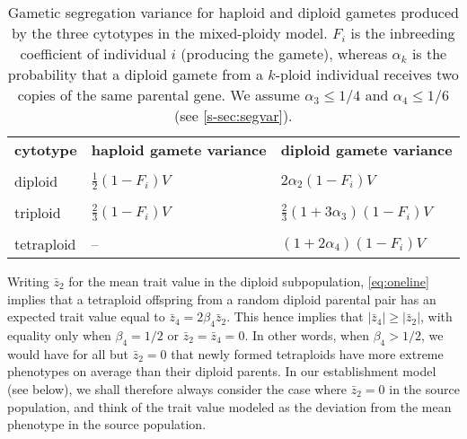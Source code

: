\documentclass[12pt,a4paper]{article}
\begin{document}
    \begin{table}[t]
    \caption{Gametic segregation variance for haploid and diploid gametes produced
    by the three cytotypes in the mixed-ploidy model. $F_i$ is the inbreeding
    coefficient of individual $i$ (producing the gamete), whereas $\alpha_k$ is the
    probability that a diploid gamete from a $k$-ploid individual receives two
    copies of the same parental gene. We assume $\alpha_3 \le 1/4$ and
        $\alpha_4 \le 1/6$ (see \cref{s-sec:segvar}).
    } \label{tbl:segvar}
    \centering
    \small
    \begin{tabularx}{\linewidth}{XXX}
    \cline{1-3}
    \textbf{cytotype}   & \textbf{haploid gamete variance} & \textbf{diploid gamete
    variance}        \\ \cline{1-3} \\[-2.5ex]
    diploid    & $\frac{1}{2}(1-F_i)V$    & $2\alpha_2(1-F_i)V$  \\ \\[-2.5ex]
    triploid   & $\frac{2}{3}(1-F_i)V$     & $\frac{2}{3}(1 + 3\alpha_3)(1-F_i)V$ \\ \\[-2.5ex]
    tetraploid & --                      & $(1+2\alpha_4)(1-F_i)V$             \\
    \cline{1-3}
    \end{tabularx}%
    \end{table}

    Writing $\bar{z}_2$ for the mean trait value in the diploid subpopulation,
    \cref{eq:oneline} implies that a tetraploid offspring from a random diploid
    parental pair has an expected trait value equal to $\bar{z}_4 =
    2\beta_4\bar{z}_2$.
    This hence implies that $|\bar{z}_4| \ge |\bar{z}_2|$, with equality only when
    $\beta_4=1/2$ or $\bar{z}_2 = \bar{z}_4 = 0$. 
    In other words, when $\beta_4 > 1/2$, we would have for all but $\bar{z}_2 = 0$
    that newly formed tetraploids have more extreme phenotypes on average than
    their diploid parents.
    In our establishment model (see below), we shall therefore always consider 
    the case where $\bar{z}_2=0$ in the source population, and think of the trait
    value modeled as the deviation from the mean phenotype in the source
    population.
\end{document}
